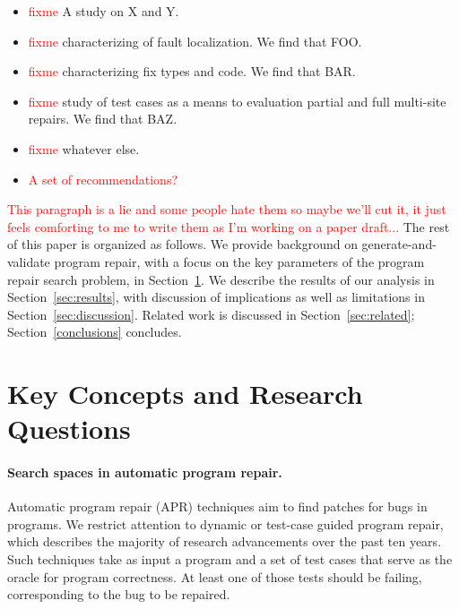 \documentclass[sigconf, timestamp-false, anonymous=true]{acmart}
\newcommand\todo[1]{\textcolor{red}{#1}}
\begin{document}
\begin{itemize}
\item \todo{fixme} A study on X and Y.
\item \todo{fixme} characterizing of fault localization.  We find that FOO.
\item \todo{fixme} characterizing fix types and code.  We find that BAR.
\item \todo{fixme} study of test cases as a means to evaluation partial and full
  multi-site repairs.  We find that BAZ.
\item \todo{fixme} whatever else.
\item \todo{A set of recommendations?}
\end{itemize}

\todo{This paragraph is a lie and some people hate them so maybe we'll cut it,
  it just feels comforting to me to write them as I'm working on a paper draft...}
The rest of this paper is organized as follows.  We provide background on
generate-and-validate program repair, with a focus on the key parameters of the
program repair search problem, in Section~\ref{sec:background}.  We describe the results of our analysis in
Section~\ref{sec:results}, with discussion of implications as well as
limitations in Section~\ref{sec:discussion}.  Related work is discussed in
Section~\ref{sec:related}; Section~\ref{conclusions} concludes.

\section{Key Concepts and Research Questions}
\label{sec:background}

\paragraph{Search spaces in automatic program repair.} Automatic program repair (APR) techniques aim to find patches for bugs in
programs.  We restrict attention to dynamic or test-case guided program repair,
which describes the majority of research advancements over the past ten years.
Such techniques take as input a program and a set of test cases that serve as
the oracle for program correctness.  At least one of those tests should be
failing, corresponding to the bug to be repaired.  
\end{document}
